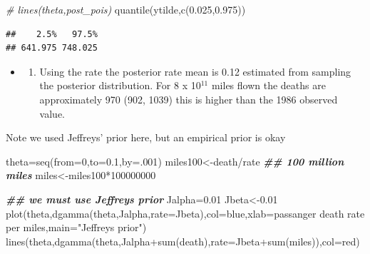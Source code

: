 \documentclass[
]{book}
\newenvironment{Shaded}{\begin{snugshade}}{\end{snugshade}}
\newcommand{\AttributeTok}[1]{\textcolor[rgb]{0.77,0.63,0.00}{#1}}
\newcommand{\CommentTok}[1]{\textcolor[rgb]{0.56,0.35,0.01}{\textit{#1}}}
\newcommand{\DecValTok}[1]{\textcolor[rgb]{0.00,0.00,0.81}{#1}}
\newcommand{\DocumentationTok}[1]{\textcolor[rgb]{0.56,0.35,0.01}{\textbf{\textit{#1}}}}
\newcommand{\FloatTok}[1]{\textcolor[rgb]{0.00,0.00,0.81}{#1}}
\newcommand{\FunctionTok}[1]{\textcolor[rgb]{0.00,0.00,0.00}{#1}}
\newcommand{\NormalTok}[1]{#1}
\newcommand{\OtherTok}[1]{\textcolor[rgb]{0.56,0.35,0.01}{#1}}
\newcommand{\SpecialCharTok}[1]{\textcolor[rgb]{0.00,0.00,0.00}{#1}}
\newcommand{\StringTok}[1]{\textcolor[rgb]{0.31,0.60,0.02}{#1}}
\providecommand{\tightlist}{%
  \setlength{\itemsep}{0pt}\setlength{\parskip}{0pt}}
\theoremstyle{definition}
\theoremstyle{definition}
\theoremstyle{definition}
\theoremstyle{definition}
\theoremstyle{remark}
\begin{document}
\begin{Shaded}
\begin{Highlighting}[]
\CommentTok{\# lines(theta,post\_pois)}
 \FunctionTok{quantile}\NormalTok{(ytilde,}\FunctionTok{c}\NormalTok{(}\FloatTok{0.025}\NormalTok{,}\FloatTok{0.975}\NormalTok{))}
\end{Highlighting}
\end{Shaded}

\begin{verbatim}
##    2.5%   97.5% 
## 641.975 748.025
\end{verbatim}

\begin{itemize}
\item
  \begin{enumerate}
  \def\labelenumi{(\alph{enumi})}
  \setcounter{enumi}{3}
  \tightlist
  \item
    Using the rate the posterior rate mean is 0.12 estimated from sampling the posterior distribution. For 8 x 10\(^11\) miles flown the deaths are approximately 970 (902, 1039) this is higher than the 1986 observed value.
  \end{enumerate}
\end{itemize}

Note we used Jeffreys' prior here, but an empirical prior is okay

\begin{Shaded}
\begin{Highlighting}[]
\NormalTok{  theta}\OtherTok{=}\FunctionTok{seq}\NormalTok{(}\AttributeTok{from=}\DecValTok{0}\NormalTok{,}\AttributeTok{to=}\FloatTok{0.1}\NormalTok{,}\AttributeTok{by=}\NormalTok{.}\DecValTok{001}\NormalTok{)}
\NormalTok{ miles100}\OtherTok{\textless{}{-}}\NormalTok{death}\SpecialCharTok{/}\NormalTok{rate }\DocumentationTok{\#\# 100 million miles}
\NormalTok{ miles}\OtherTok{\textless{}{-}}\NormalTok{miles100}\SpecialCharTok{*}\DecValTok{100000000}

 


   
  \DocumentationTok{\#\# we must use Jeffreys\textquotesingle{} prior}
\NormalTok{    Jalpha}\OtherTok{=}\FloatTok{0.01}
\NormalTok{  Jbeta}\OtherTok{\textless{}{-}}\FloatTok{0.01}
 \FunctionTok{plot}\NormalTok{(theta,}\FunctionTok{dgamma}\NormalTok{(theta,Jalpha,}\AttributeTok{rate=}\NormalTok{Jbeta),}\AttributeTok{col=}\StringTok{\textquotesingle{}blue\textquotesingle{}}\NormalTok{,}\AttributeTok{xlab=}\StringTok{\textquotesingle{}passanger death rate per miles\textquotesingle{}}\NormalTok{,}\AttributeTok{main=}\StringTok{"Jeffreys\textquotesingle{} prior"}\NormalTok{)}
\FunctionTok{lines}\NormalTok{(theta,}\FunctionTok{dgamma}\NormalTok{(theta,Jalpha}\SpecialCharTok{+}\FunctionTok{sum}\NormalTok{(death),}\AttributeTok{rate=}\NormalTok{Jbeta}\SpecialCharTok{+}\FunctionTok{sum}\NormalTok{(miles)),}\AttributeTok{col=}\StringTok{\textquotesingle{}red\textquotesingle{}}\NormalTok{)}
\end{Highlighting}
\end{Shaded}
\end{document}
